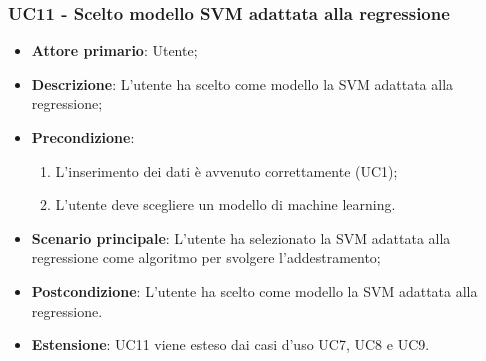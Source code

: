 \subsubsection{UC11 - Scelto modello SVM adattata alla regressione}
\label{sssec:uc11}
\begin{itemize}
  \item \textbf{Attore primario}: Utente;
  \item \textbf{Descrizione}: L'utente ha scelto come modello la SVM adattata alla regressione;
  \item \textbf{Precondizione}:
  \begin{enumerate}
    \item L'inserimento dei dati è avvenuto correttamente (UC1);
    \item L'utente deve scegliere un modello di machine learning.
  \end{enumerate}
  \item \textbf{Scenario principale}: L'utente ha selezionato la SVM adattata alla regressione come algoritmo per svolgere l'addestramento;
  \item \textbf{Postcondizione}: L'utente ha scelto come modello la SVM adattata alla regressione.
  \item \textbf{Estensione}: UC11 viene esteso dai casi d'uso UC7, UC8 e UC9.
\end{itemize}
